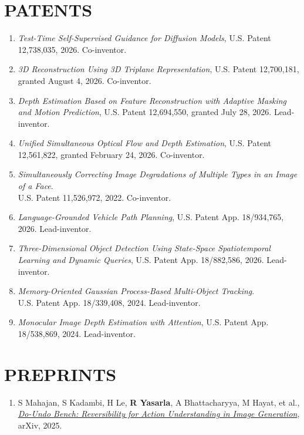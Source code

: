 \documentclass[margin,11pt]{resume}
\begin{document}
\vspace{-0.8em}
\section{\footnotesize {\large P}ATENTS}
\begin{enumerate}[leftmargin=*,itemsep=0pt,topsep=2pt]
    \item \textit{Test-Time Self-Supervised Guidance for Diffusion Models}, U.S. Patent 12,738,035, 2026. Co-inventor.
    \item \textit{3D Reconstruction Using 3D Triplane Representation}, U.S. Patent 12,700,181, granted August 4, 2026. Co-inventor.
    \item \textit{Depth Estimation Based on Feature Reconstruction with Adaptive Masking and Motion Prediction}, U.S. Patent 12,694,550, granted July 28, 2026. Lead-inventor.
    \item \textit{Unified Simultaneous Optical Flow and Depth Estimation}, U.S. Patent 12,561,822, granted February 24, 2026. Co-inventor.
    \item \textit{Simultaneously Correcting Image Degradations of Multiple Types in an Image of a Face}.\\ U.S. Patent 11,526,972, 2022. Co-inventor.
    \item \textit{Language-Grounded Vehicle Path Planning}, U.S. Patent App. 18/934,765, 2026. Lead-inventor.
    \item \textit{Three-Dimensional Object Detection Using State-Space Spatiotemporal Learning and Dynamic Queries}, U.S. Patent App. 18/882,586, 2026. Lead-inventor.
    \item \textit{Memory-Oriented Gaussian Process-Based Multi-Object Tracking}.\\ U.S. Patent App. 18/339,408, 2024. Lead-inventor.
    \item \textit{Monocular Image Depth Estimation with Attention}, U.S. Patent App. 18/538,869, 2024. Lead-inventor.
\end{enumerate}

\vspace{-0.8em}
\section{\footnotesize {\large P}REPRINTS}
\begin{enumerate}[leftmargin=*,itemsep=0pt,topsep=2pt]
    \item S Mahajan, S Kadambi, H Le, \textbf{R Yasarla}, A Bhattacharyya, M Hayat, et al., \textit{\href{https://arxiv.org/abs/2512.13609}{Do-Undo Bench: Reversibility for Action Understanding in Image Generation}}, arXiv, 2025.
\end{enumerate}
\end{document}
